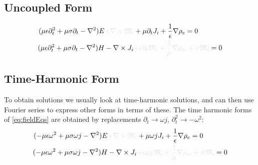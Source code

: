 \documentclass{article}
\numberwithin{equation}{section}
\begin{document}
        \subsection{Uncoupled Form}
            \begin{subequations} \label{eq:fieldEqs}
                \begin{align}
                    (\mu \epsilon \partial^2_t + \mu \sigma \partial_t - \nabla^2 ) E &
                        \begingroup \textcolor{vanish}{+ \nabla \times \mathfrak{M}_i} 
                        \endgroup + \mu \partial_t J_i + \frac{1}{\epsilon} \nabla
                        \rho_e = 0 \label{eq:electricFieldEq} \\
                    (\mu \epsilon \partial^2_t + \mu \sigma \partial_t - \nabla^2 ) H & -
                        \nabla \times J_i \begingroup \textcolor{vanish}{+ \epsilon
                        \partial_t \mathfrak{M}_i + \frac{1}{\mu} \nabla \rho_m + \sigma
                        \mathfrak{M}_i} \endgroup = 0 \label{eq:magneticFieldEq}
                \end{align}
            \end{subequations}
        \subsection{Time-Harmonic Form}
            To obtain solutions we usually look at time-harmonic solutions, and can then
            use Fourier series to express other forms in terms of these. The time
            harmonic forms of \eqref{eq:fieldEqs} are obtained by replacements
            $\partial_t \to \omega j$, $\partial_t^2 \to - \omega^2$:
            \begin{subequations} \label{eq:fieldEqsTH}
                \begin{align}
                    (- \mu \epsilon \omega^2 + \mu \sigma \omega j - \nabla^2 ) E &
                        \begingroup \textcolor{vanish}{+ \nabla \times \mathfrak{M}_i}
                        \endgroup + \mu \omega j J_i + \frac{1}{\epsilon} \nabla \rho_e
                        = 0 \label{eq:electricFieldEqTH} \\
                    (-\mu \epsilon \omega^2 + \mu \sigma \omega j - \nabla^2 ) H & -
                        \nabla \times J_i \begingroup \textcolor{vanish}{+ \epsilon
                        \omega j \mathfrak{M}_i + \frac{1}{\mu} \nabla \rho_m + \sigma
                        \mathfrak{M}_i} \endgroup = 0 \label{eq:magneticFieldEqTH}
                \end{align}
            \end{subequations}
\end{document}
